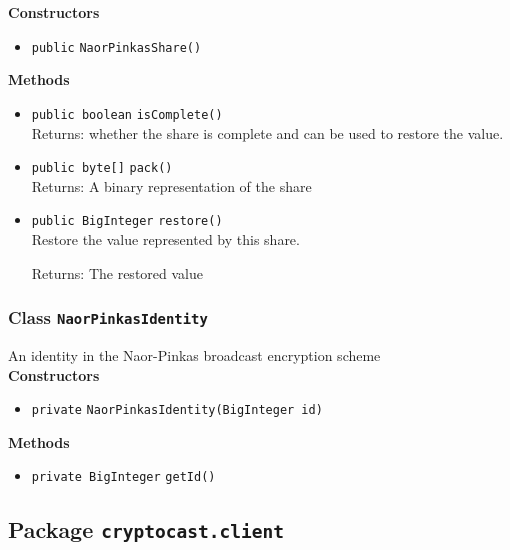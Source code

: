 \textbf{Constructors}
\begin{itemize}
\item \lstinline|public| \lstinline|NaorPinkasShare|\lstinline|()|




\end{itemize}


\textbf{Methods}
\begin{itemize}
\item \lstinline|public boolean| \lstinline|isComplete|\lstinline|()|\\
Returns: whether the share is complete and can be used to restore
 the value.



\item \lstinline|public byte[]| \lstinline|pack|\lstinline|()|\\
Returns: A binary representation of the share



\item \lstinline|public BigInteger| \lstinline|restore|\lstinline|()|\\
Restore the value represented by this share.

Returns: The restored value

\end{itemize}

\subsubsection{Class \lstinline|NaorPinkasIdentity|}
An identity in the Naor-Pinkas broadcast encryption scheme \\




\textbf{Constructors}
\begin{itemize}
\item \lstinline|private| \lstinline|NaorPinkasIdentity|\lstinline|(BigInteger id)|




\end{itemize}


\textbf{Methods}
\begin{itemize}
\item \lstinline|private BigInteger| \lstinline|getId|\lstinline|()|




\end{itemize}


\subsection{Package \lstinline!cryptocast.client!}
